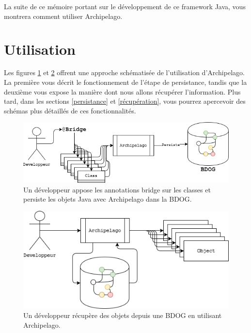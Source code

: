 \documentclass[a4paper,fleqn,12pt,oneside]{book}
\begin{document}
La suite de ce mémoire portant sur le développement de ce framework Java, vous montrera comment utiliser Archipelago.
\section{Utilisation}
\label{utilisation}
Les figures \ref{fig:HelocoP} et \ref{fig:HelocoG} offrent une approche schématisée de l'utilisation d'Archipelago. 
\\La première vous décrit le fonctionnement de l'étape de persistance, tandis que la deuxième vous expose la manière dont nous allons récupérer l'information. Plus tard, dans les sections \ref{persistance} et \ref{récupération}, vous pourrez apercevoir des schémas plus détaillés de ces fonctionnalités.
\begin{figure}[!ht]
\centering
\includegraphics[scale=0.7]{figures/HelocoP.png}
\caption{Un développeur appose les annotations bridge sur les classes et persiste les objets Java avec Archipelago dans la BDOG.}
\label{fig:HelocoP}
\end{figure}
\begin{figure}[!ht]
\centering
\includegraphics[scale=0.8]{figures/HelocoG.png}
\caption{Un développeur récupère des objets depuis une BDOG en utilisant Archipelago.}
\label{fig:HelocoG}
\end{figure}
\newpage
\label{opérations}
\end{document}
